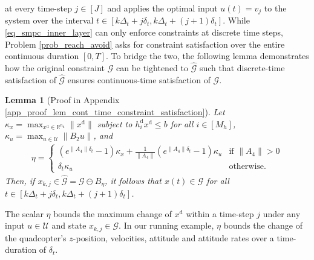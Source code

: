 \documentclass{IEEEtran}
\newtheorem{lemma}[theorem]{Lemma}
\begin{document}
at every time-step $j\in[J]$ and applies the optimal input $u(t)=v_j$ to the system over the interval $t\in[k\Delta_t + j\delta_t, k\Delta_t + (j+1)\delta_t]$. 
While \eqref{eq_smpc_inner_layer} can only enforce constraints at discrete time steps, Problem \ref{prob_reach_avoid} asks for constraint satisfaction over the entire continuous duration $[0, T]$. To bridge the two, the following lemma demonstrates how the original constraint $\mathcal{G}$ can be tightened to $\hat{\mathcal{G}}$ such that discrete-time satisfaction of $\hat{\mathcal{G}}$ ensures continuous-time satisfaction of $\mathcal{G}$.
\begin{lemma}[Proof in Appendix \ref{app_proof_lem_cont_time_constraint_satisfaction}]\label{lem_cont_time_constraint_satisfaction}
    Let $\kappa_x=\max_{x^{\text{d}}\in\mathbb{R}^{n_{\text{d}}}}\|x^{\text{d}}\|$ subject to $h_i^{\text{d}}x^{\text{d}}\leq b$ for all $i\in[M_h]$, $\kappa_u=\max_{u\in\mathcal{U}}\|B_2u\|$, and
    \begin{align*}
        \eta\!=\!\begin{cases}
            (e^{\|\!A_4\!\|\delta_t}\!-\!1)\kappa_x\!+\!\frac{1}{\|\!A_4\!\|}(e^{\|\!A_4\!\|\delta_t}\!-\!1) \kappa_u & \text{if $\|A_4\|\!>\!0$} \\
            \delta_t \kappa_u & \text{otherwise.}
        \end{cases}
    \end{align*}
    Then, if $x_{k,j}\in\hat{\mathcal{G}}=\mathcal{G}\ominus B_{\eta}$,
    it follows that $x(t)\in\mathcal{G}$ for all $t\in[k\Delta_t+j\delta_t,k\Delta_t+(j+1)\delta_t]$.
\end{lemma}
The scalar $\eta$ bounds the maximum change of $x^{\text{d}}$ within a time-step $j$ under any input $u\in\mathcal{U}$ and state $x_{k,j}\in\mathcal{G}$. In our running example, $\eta$ bounds the change of the quadcopter's $z$-position, velocities, attitude and attitude rates over a time-duration of $\delta_t$. 
\end{document}
